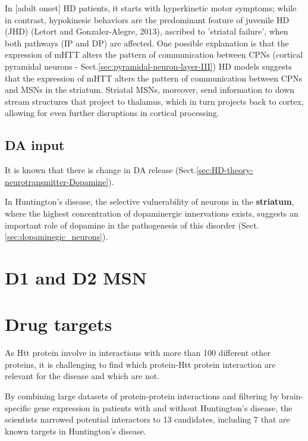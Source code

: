 In [adult onset] HD patients, it starts with hyperkinetic motor symptoms; while
in contrast, hypokinesic behaviors are the predominant feature of juvenile HD
(JHD) (Letort and Gonzalez-Alegre, 2013), ascribed to 'striatal failure', when
both pathways (IP and DP) are affected. One possible explanation is that the
expression of mHTT alters the pattern of communication between CPNs (cortical pyramidal neurons -
Sect.\ref{sec:pyramidal-neuron-layer-III}) HD models suggests that the
expression of mHTT alters the pattern of communication between CPNs and MSNs in
the striatum. Striatal MSNs, moreover, send information to down stream
structures that project to thalamus, which in turn projects back to cortex,
allowing for even further disruptions in cortical processing.


\subsection{DA input}
\label{sec:HD-role-of-dopaminergic-input}

It is known that there is change in DA release
(Sect.\ref{sec:HD-theory-neurotransmitter-Dopamine}).

In Huntington's disease, the selective vulnerability of neurons in the {\bf
striatum}, where the highest concentration of dopaminergic innervations exists,
suggests an important role of dopamine in the pathogenesis of this disorder
(Sect.\ref{sec:dopaminegic_neurons}).

\section{D1 and D2 MSN}
\label{sec:HD-role-of-MSN}



\section{Drug targets}
\label{sec:drug-target-Huntington}

As Htt protein involve in interactions with more than 100 different other
proteins, it is challenging to find which protein-Htt protein interaction are
relevant for the disease and which are not.

By combining large datasets of protein-protein interactions and filtering by
brain-specific gene expression in patients with and without Huntington's
disease, the scientists narrowed potential interactors to 13 candidates,
including 7 that are known targets in Huntington's disease.

